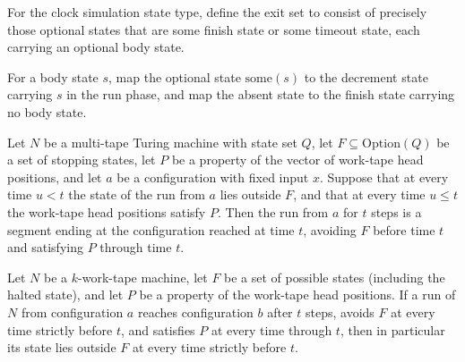 \begin{definition}
\label{Turing.sc_exits}
\leanok
{}
For the clock simulation state type, define the exit set to consist of precisely those
optional states that are some finish state or some timeout state, each carrying an
optional body state.
\end{definition}

\begin{definition}
\label{Turing.sc_resume}
\leanok
{}
For a body state $s$, map the optional state $\mathrm{some}(s)$ to the decrement state
carrying $s$ in the run phase, and map the absent state to the finish state carrying no
body state.
\end{definition}

\begin{theorem}
\label{Turing.sc_observedSegment}
\leanok
{}
Let $N$ be a multi-tape Turing machine with state set $Q$, let
$F\subseteq\mathrm{Option}(Q)$ be a set of stopping states, let $P$ be a property of the
vector of work-tape head positions, and let $a$ be a configuration with fixed input $x$.
Suppose that at every time $u<t$ the state of the run from $a$ lies outside $F$, and
that at every time $u\le t$ the work-tape head positions satisfy $P$. Then the run from
$a$ for $t$ steps is a segment ending at the configuration reached at time $t$, avoiding
$F$ before time $t$ and satisfying $P$ through time $t$.
\end{theorem}

\begin{theorem}
\label{Turing.sc_firstExit}
\leanok
{}
Let $N$ be a $k$-work-tape machine, let $F$ be a set of possible states (including the
halted state), and let $P$ be a property of the work-tape head positions. If a run of
$N$ from configuration $a$ reaches configuration $b$ after $t$ steps, avoids $F$ at
every time strictly before $t$, and satisfies $P$ at every time through $t$, then in
particular its state lies outside $F$ at every time strictly before $t$.
\end{theorem}

